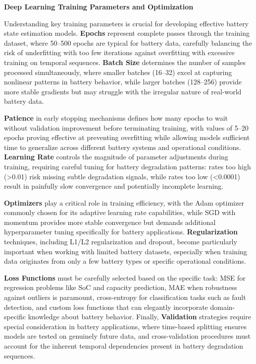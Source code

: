 \vspace{1cm}

\textbf{Deep Learning Training Parameters and Optimization}

Understanding key training parameters is crucial for developing effective battery state estimation models. \textbf{Epochs} represent complete passes through the training dataset, where 50--500 epochs are typical for battery data, carefully balancing the risk of underfitting with too few iterations against overfitting with excessive training on temporal sequences. \textbf{Batch Size} determines the number of samples processed simultaneously, where smaller batches (16--32) excel at capturing nonlinear patterns in battery behavior, while larger batches (128--256) provide more stable gradients but may struggle with the irregular nature of real-world battery data.

\textbf{Patience} in early stopping mechanisms defines how many epochs to wait without validation improvement before terminating training, with values of 5--20 epochs proving effective at preventing overfitting while allowing models sufficient time to generalize across different battery systems and operational conditions. \textbf{Learning Rate} controls the magnitude of parameter adjustments during training, requiring careful tuning for battery degradation patterns: rates too high (>0.01) risk missing subtle degradation signals, while rates too low (<0.0001) result in painfully slow convergence and potentially incomplete learning.

\textbf{Optimizers} play a critical role in training efficiency, with the Adam optimizer commonly chosen for its adaptive learning rate capabilities, while SGD with momentum provides more stable convergence but demands additional hyperparameter tuning specifically for battery applications. \textbf{Regularization} techniques, including L1/L2 regularization and dropout, become particularly important when working with limited battery datasets, especially when training data originates from only a few battery types or specific operational conditions.

\textbf{Loss Functions} must be carefully selected based on the specific task: MSE for regression problems like SoC and capacity prediction, MAE when robustness against outliers is paramount, cross-entropy for classification tasks such as fault detection, and custom loss functions that can elegantly incorporate domain-specific knowledge about battery behavior. Finally, \textbf{Validation} strategies require special consideration in battery applications, where time-based splitting ensures models are tested on genuinely future data, and cross-validation procedures must account for the inherent temporal dependencies present in battery degradation sequences.


